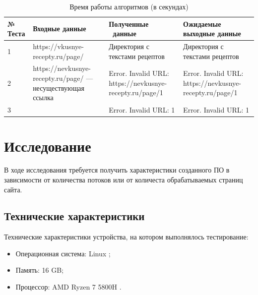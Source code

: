 \begin{table}[h]
	\begin{center}
		\begin{threeparttable}
		\captionsetup{justification=raggedright,singlelinecheck=off}
		\caption{Время работы алгоритмов (в секундах)}
		\label{tbl:time_measurements}
                        \begin{tabular}{|p{4cm}|p{4cm}|p{4cm}|p{4cm}|}
                            \hline
                            № Теста & Входные данные & Полученные \ данные & Ожидаемые выходные данные \\
                            \hline
                            1 & https://vkusnye-recepty.ru/page/ & Директория с текстами рецептов &
                            Директория с текстами рецептов \\
                            \hline
                            2 & https://nevkusnye-recepty.ru/page/ --- несуществующая ссылка
                              & Error. Invalid URL: https://nevkusnye-recepty.ru/page/1 &
                            Error. Invalid URL: https://nevkusnye-recepty.ru/page/1 \\
                            \hline
                            3 &  & Error. Invalid URL: 1 &
                            Error. Invalid URL: 1 \\
                            \hline

                        \end{tabular}
		\end{threeparttable}
    \end{center}
\end{table}

\section{Исследование}
В ходе исследования требуется получить характеристики созданного ПО в зависимости
от количества потоков или от количеста обрабатываемых страниц сайта.

\subsection{Технические характеристики}
Технические характеристики устройства, на котором выполнялось тестирование:
\begin{itemize}
    \item Операционная система: Linux \cite{bib1};
    \item Память: 16 GB;
    \item Процессор: AMD Ryzen 7 5800H \cite{bib2, bib3}.
\end{itemize}

